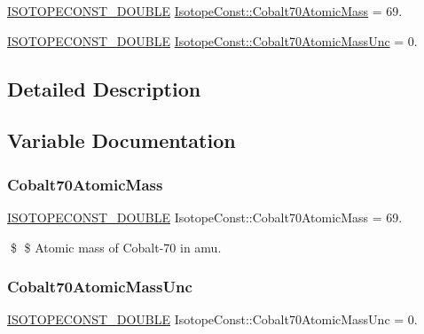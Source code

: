 \begin{DoxyCompactItemize}
\item 
\mbox{\hyperlink{group___isotope_const-_macros_ga8f45a7272ce02c0b4c65c44636ed719a}{I\+S\+O\+T\+O\+P\+E\+C\+O\+N\+S\+T\+\_\+\+D\+O\+U\+B\+LE}} \mbox{\hyperlink{group___isotope_const-_cobalt-_co70_ga1dbf7561022cae88eaabcc4765ba0085}{Isotope\+Const\+::\+Cobalt70\+Atomic\+Mass}} = 69.
\item 
\mbox{\hyperlink{group___isotope_const-_macros_ga8f45a7272ce02c0b4c65c44636ed719a}{I\+S\+O\+T\+O\+P\+E\+C\+O\+N\+S\+T\+\_\+\+D\+O\+U\+B\+LE}} \mbox{\hyperlink{group___isotope_const-_cobalt-_co70_ga922067fcaf1fbf19fa3e5d8aa0af682c}{Isotope\+Const\+::\+Cobalt70\+Atomic\+Mass\+Unc}} = 0.
\end{DoxyCompactItemize}


\subsection{Detailed Description}


\subsection{Variable Documentation}
\mbox{\label{group___isotope_const-_cobalt-_co70_ga1dbf7561022cae88eaabcc4765ba0085}} 
\subsubsection{\texorpdfstring{Cobalt70\+Atomic\+Mass}{Cobalt70AtomicMass}}
{\footnotesize\ttfamily \mbox{\hyperlink{group___isotope_const-_macros_ga8f45a7272ce02c0b4c65c44636ed719a}{I\+S\+O\+T\+O\+P\+E\+C\+O\+N\+S\+T\+\_\+\+D\+O\+U\+B\+LE}} Isotope\+Const\+::\+Cobalt70\+Atomic\+Mass = 69.}

\$ \$ Atomic mass of Cobalt-\/70 in amu. \mbox{\label{group___isotope_const-_cobalt-_co70_ga922067fcaf1fbf19fa3e5d8aa0af682c}} 
\subsubsection{\texorpdfstring{Cobalt70\+Atomic\+Mass\+Unc}{Cobalt70AtomicMassUnc}}
{\footnotesize\ttfamily \mbox{\hyperlink{group___isotope_const-_macros_ga8f45a7272ce02c0b4c65c44636ed719a}{I\+S\+O\+T\+O\+P\+E\+C\+O\+N\+S\+T\+\_\+\+D\+O\+U\+B\+LE}} Isotope\+Const\+::\+Cobalt70\+Atomic\+Mass\+Unc = 0.}

